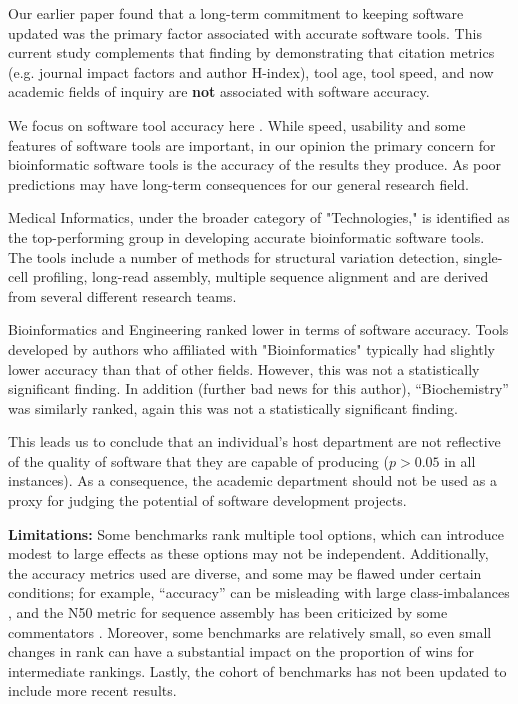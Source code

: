 \documentclass[fleqn,10pt,doc,onecolumn]{SelfArx}%
\begin{document}
Our earlier paper found that a long-term commitment to keeping
software updated was the primary factor associated with accurate
software tools. This current study complements that finding by demonstrating 
that citation metrics (e.g. journal impact factors and
author H-index), tool age, tool speed, and now academic fields of
inquiry are \textbf{not} associated with software accuracy.

We focus on software tool accuracy here \cite{weber2019essential}. While speed, usability and
some features of software tools are important, in our opinion the
primary concern for bioinformatic software tools is the accuracy of
the results they produce. As poor predictions may have long-term consequences for
our general research field. 

Medical Informatics, under the broader category of "Technologies," is
identified as the top-performing group in developing accurate
bioinformatic software tools. The tools include a number of methods
for structural variation detection, single-cell profiling, long-read
assembly, multiple sequence alignment and are derived from several
different research teams. 

Bioinformatics and Engineering ranked lower in terms of software
accuracy. Tools developed by authors who affiliated with
"Bioinformatics" typically had slightly lower accuracy than that of
other fields. However, this was not a statistically significant
finding. In addition (further bad news for this author),
``Biochemistry'' was similarly ranked, again this was not a
statistically significant finding.

This leads us to conclude that an individual's host department are not
reflective of the quality of software that they are capable of
producing ($p>0.05$ in all instances). As a consequence, the academic
department should not be used as a proxy for judging the potential of
software development projects.

\textbf{Limitations:} Some benchmarks rank multiple tool options,
which can introduce modest to large effects as these options may not
be independent. Additionally, the accuracy metrics used are diverse,
and some may be flawed under certain conditions; for example,
``accuracy'' can be misleading with large class-imbalances
\cite{luque2019impact}, and the N50 metric for sequence assembly has
been criticized by some commentators \cite{xie2021pdr}. Moreover, some
benchmarks are relatively small, so even small changes in rank can
have a substantial impact on the proportion of wins for intermediate
rankings. Lastly, the cohort of benchmarks has not been updated to
include more recent results.
\end{document}
